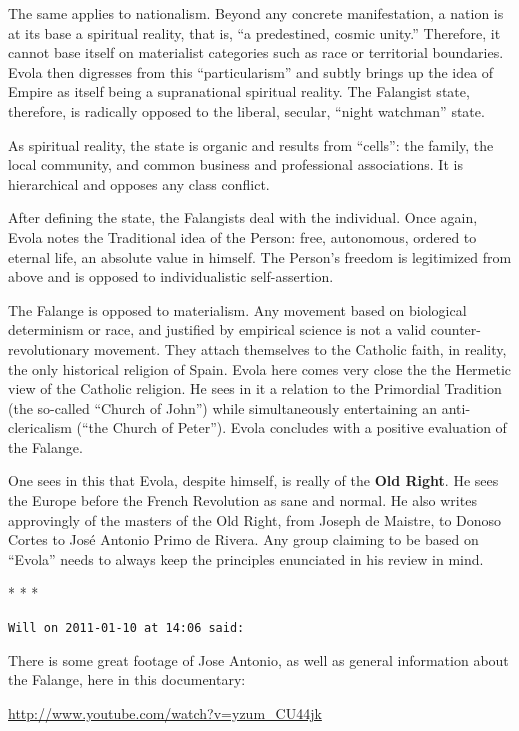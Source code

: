 The same applies to nationalism. Beyond any concrete manifestation, a nation is at its base a spiritual reality, that is, ``a predestined, cosmic unity.'' Therefore, it cannot base itself on materialist categories such as race or territorial boundaries. Evola then digresses from this ``particularism'' and subtly brings up the idea of Empire as itself being a supranational spiritual reality. The Falangist state, therefore, is radically opposed to the liberal, secular, ``night watchman'' state.

As spiritual reality, the state is organic and results from ``cells'': the family, the local community, and common business and professional associations. It is hierarchical and opposes any class conflict.

After defining the state, the Falangists deal with the individual. Once again, Evola notes the Traditional idea of the Person: free, autonomous, ordered to eternal life, an absolute value in himself. The Person's freedom is legitimized from above and is opposed to individualistic self-assertion.

The Falange is opposed to materialism. Any movement based on biological determinism or race, and justified by empirical science is not a valid counter-revolutionary movement. They attach themselves to the Catholic faith, in reality, the only historical religion of Spain. Evola here comes very close the the Hermetic view of the Catholic religion. He sees in it a relation to the Primordial Tradition (the so-called ``Church of John'') while simultaneously entertaining an anti-clericalism (``the Church of Peter''). Evola concludes with a positive evaluation of the Falange.

One sees in this that Evola, despite himself, is really of the \textbf{Old Right}. He sees the Europe before the French Revolution as sane and normal. He also writes approvingly of the masters of the Old Right, from Joseph de Maistre, to Donoso Cortes to José Antonio Primo de Rivera. Any group claiming to be based on ``Evola'' needs to always keep the principles enunciated in his review in mind.


\begin{center}* * *\end{center}

\begin{footnotesize}
\begin{sffamily}
\texttt{Will on 2011-01-10 at 14:06 said:}

There is some great footage of Jose Antonio, as well as general information about the Falange, here in this documentary:

\url{http://www.youtube.com/watch?v=yzum\_CU44jk}


\end{sffamily}
\end{footnotesize}

